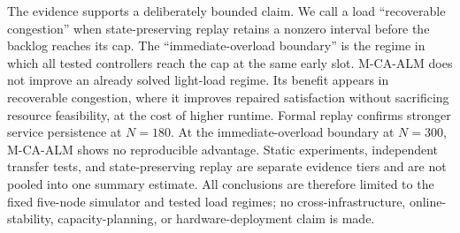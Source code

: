 The evidence supports a deliberately bounded claim. We call a load ``recoverable congestion'' when state-preserving replay retains a nonzero interval before the backlog reaches its cap. The ``immediate-overload boundary'' is the regime in which all tested controllers reach the cap at the same early slot. M-CA-ALM does not improve an already solved light-load regime. Its benefit appears in recoverable congestion, where it improves repaired satisfaction without sacrificing resource feasibility, at the cost of higher runtime. Formal replay confirms stronger service persistence at $N=180$. At the immediate-overload boundary at $N=300$, M-CA-ALM shows no reproducible advantage. Static experiments, independent transfer tests, and state-preserving replay are separate evidence tiers and are not pooled into one summary estimate. All conclusions are therefore limited to the fixed five-node simulator and tested load regimes; no cross-infrastructure, online-stability, capacity-planning, or hardware-deployment claim is made.
